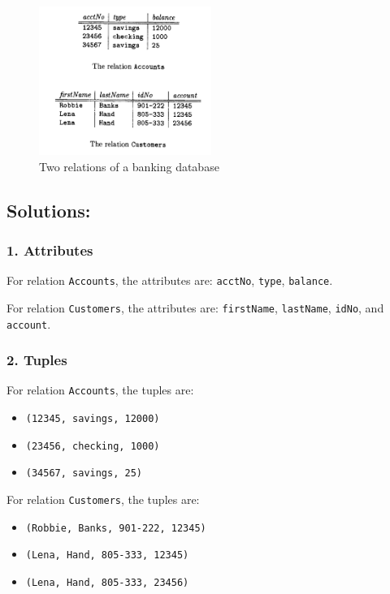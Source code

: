 \documentclass{cshwk}
\begin{document}
\begin{figure}[H]
    \centering
    \includegraphics[width=0.5\textwidth]{hw2-1.png}
    \caption{Two relations of a banking database}
    \label{fig:221-fig}
\end{figure}

\subsection*{Solutions:}

\subsubsection*{1. Attributes}
For relation \texttt{Accounts}, the attributes are: \texttt{acctNo}, \texttt{type}, \texttt{balance}.

\noindent For relation \texttt{Customers}, the attributes are: \texttt{firstName}, \texttt{lastName}, \texttt{idNo}, and \texttt{account}.

\subsubsection*{2. Tuples}
For relation \texttt{Accounts}, the tuples are:
\begin{itemize}
    \item \texttt{(12345, savings, 12000)}
    \item \texttt{(23456, checking, 1000)}
    \item \texttt{(34567, savings, 25)}
\end{itemize}

\noindent For relation \texttt{Customers}, the tuples are:
\begin{itemize}
    \item \texttt{(Robbie, Banks, 901-222, 12345)}
    \item \texttt{(Lena, Hand, 805-333, 12345)}
    \item \texttt{(Lena, Hand, 805-333, 23456)}
\end{itemize}
\end{document}
